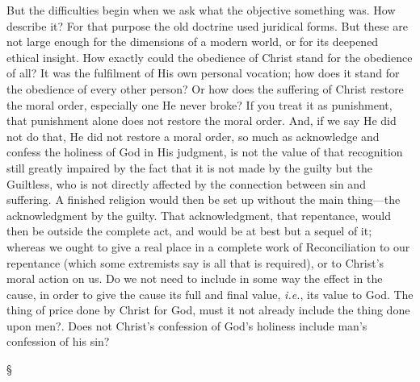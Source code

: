 \documentclass[12pt,a5paper,twoside,titlepage]{book}
\begin{document}
But the difficulties begin when we ask what 
the objective something was. How describe it? 
For that purpose the old doctrine used juridical 
forms. But these are not large enough for 
the dimensions of a modern world, or for its 
deepened ethical insight. How exactly could the 
obedience of Christ stand for the obedience of 
all? It was the fulfilment of His own personal 
vocation; how does it stand for the obedience 
of every other person? Or how does the suffering 
of Christ restore the moral order, especially 
one He never broke? If you treat it as punishment, 
that punishment alone does not restore 
the moral order. And, if we say He did not do 
that, He did not restore a moral order, so much 
as acknowledge and confess the holiness of God 
in His judgment, is not the value of that recognition 
still greatly impaired by the fact that it 
is not made by the guilty but the Guiltless, who 
is not directly affected by the connection between 
sin and suffering. A finished religion 
would then be set up without the main thing---the 
acknowledgment by the guilty. That acknowledgment, 
that repentance, would then be 
outside the complete act, and would be at best 
but a sequel of it; whereas we ought to give 
a real place in a complete work of Reconciliation 
to our repentance (which some extremists say is 
all that is required), or to Christ's moral action 
on us. Do we not need to include in some way 
the effect in the cause, in order to give the cause 
its full and final value, \textit{i.e.}, its value to God. 
The thing of price done by Christ for God, must 
it not already include the thing done upon men?. 
Does not Christ's confession of God's holiness 
include man's confession of his sin? 

\begin{center}
\S
\end{center}
\end{document}
